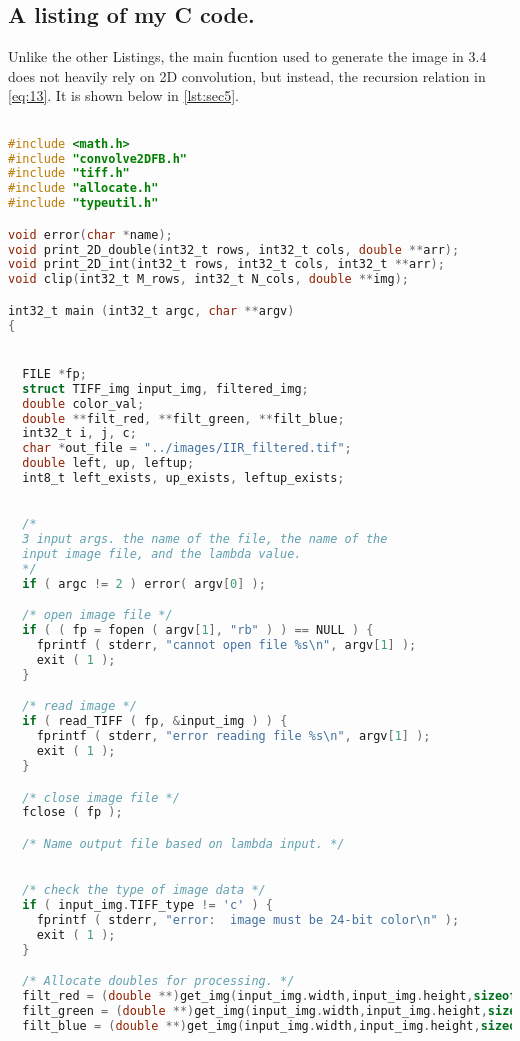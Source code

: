 \documentclass{article}
\begin{document}
\subsection{A listing of my C code.}
Unlike the other Listings, the main fucntion used to generate the image in 3.4 does not heavily rely on 2D convolution, but instead, the recursion relation in \eqref{eq:13}. It is shown below in \ref{lst:sec5}.
\begin{lstlisting}[language=C, caption=filter\_image\_section5.c, label={lst:sec5}]

#include <math.h>
#include "convolve2DFB.h"
#include "tiff.h"
#include "allocate.h"
#include "typeutil.h"

void error(char *name);
void print_2D_double(int32_t rows, int32_t cols, double **arr);
void print_2D_int(int32_t rows, int32_t cols, int32_t **arr);
void clip(int32_t M_rows, int32_t N_cols, double **img);

int32_t main (int32_t argc, char **argv) 
{


  FILE *fp;
  struct TIFF_img input_img, filtered_img;
  double color_val;
  double **filt_red, **filt_green, **filt_blue;
  int32_t i, j, c;
  char *out_file = "../images/IIR_filtered.tif";
  double left, up, leftup;
  int8_t left_exists, up_exists, leftup_exists;

  
  /*
  3 input args. the name of the file, the name of the
  input image file, and the lambda value.
  */
  if ( argc != 2 ) error( argv[0] );

  /* open image file */
  if ( ( fp = fopen ( argv[1], "rb" ) ) == NULL ) {
    fprintf ( stderr, "cannot open file %s\n", argv[1] );
    exit ( 1 );
  }

  /* read image */
  if ( read_TIFF ( fp, &input_img ) ) {
    fprintf ( stderr, "error reading file %s\n", argv[1] );
    exit ( 1 );
  }

  /* close image file */
  fclose ( fp );

  /* Name output file based on lambda input. */
  

  /* check the type of image data */
  if ( input_img.TIFF_type != 'c' ) {
    fprintf ( stderr, "error:  image must be 24-bit color\n" );
    exit ( 1 );
  }

  /* Allocate doubles for processing. */
  filt_red = (double **)get_img(input_img.width,input_img.height,sizeof(double));
  filt_green = (double **)get_img(input_img.width,input_img.height,sizeof(double));
  filt_blue = (double **)get_img(input_img.width,input_img.height,sizeof(double));


\end{lstlisting}
\end{document}

